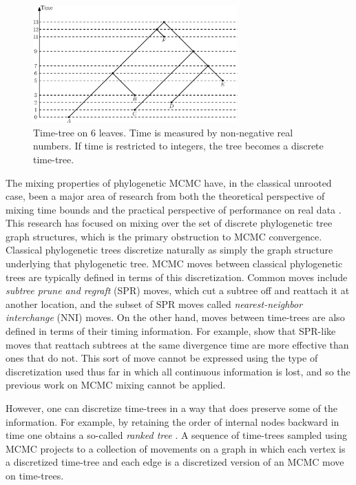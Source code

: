 \documentclass{amsart}
\theoremstyle{definition}
\begin{document}
\begin{figure}[ht]
\centering
\includegraphics[width=0.7\textwidth]{timeTree.eps}
\caption{Time-tree on $6$ leaves.
Time is measured by non-negative real numbers.
If time is restricted to integers, the tree becomes a discrete time-tree.}
\label{timeTree.eps}
\end{figure}

The mixing properties of phylogenetic MCMC have, in the classical unrooted case, been a major area of research from both the theoretical perspective of mixing time bounds \autocite{Mossel2005-ly,Mossel2006-fo,Stefankovic2011-hu,spade2014note} and the practical perspective of performance on real data \autocite{beiko2006searching,Ronquist2006-fv,lakner2008efficiency,Whidden2015-yi}.
This research has focused on mixing over the set of discrete phylogenetic tree graph structures, which is the primary obstruction to MCMC convergence.
Classical phylogenetic trees discretize naturally as simply the graph structure underlying that phylogenetic tree.
MCMC moves between classical phylogenetic trees are typically defined in terms of this discretization.
Common moves include \emph{subtree prune and regraft} (SPR) moves, which cut a subtree off and reattach it at another location, and the subset of SPR moves called \emph{nearest-neighbor interchange} (NNI) moves.
On the other hand, moves between time-trees are also defined in terms of their timing information.
For example, \textcite{Hohna2008-vl} show that SPR-like moves that reattach subtrees at the same divergence time are more effective than ones that do not.
This sort of move cannot be expressed using the type of discretization used thus far in which all continuous information is lost, and so the previous work on MCMC mixing cannot be applied.

However, one can discretize time-trees in a way that does preserve some of the information.
For example, by retaining the order of internal nodes backward in time one obtains a so-called \emph{ranked tree} \autocite{Semple2003-nj}.
A sequence of time-trees sampled using MCMC projects to a collection of movements on a graph in which each vertex is a discretized time-tree and each edge is a discretized version of an MCMC move on time-trees.
\end{document}
